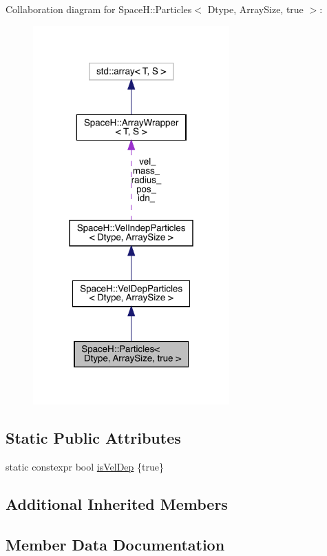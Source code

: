 Collaboration diagram for SpaceH\+:\+:Particles$<$ Dtype, Array\+Size, true $>$\+:
\nopagebreak
\begin{figure}[H]
\begin{center}
\leavevmode
\includegraphics[width=214pt]{struct_space_h_1_1_particles_3_01_dtype_00_01_array_size_00_01true_01_4__coll__graph}
\end{center}
\end{figure}
\subsection*{Static Public Attributes}
\begin{DoxyCompactItemize}
\item 
static constexpr bool \mbox{\hyperlink{struct_space_h_1_1_particles_3_01_dtype_00_01_array_size_00_01true_01_4_a171609d16bedb2c33dcbe5887dd983e3}{is\+Vel\+Dep}} \{true\}
\end{DoxyCompactItemize}
\subsection*{Additional Inherited Members}


\subsection{Member Data Documentation}
\mbox{\label{struct_space_h_1_1_particles_3_01_dtype_00_01_array_size_00_01true_01_4_a171609d16bedb2c33dcbe5887dd983e3}} 
